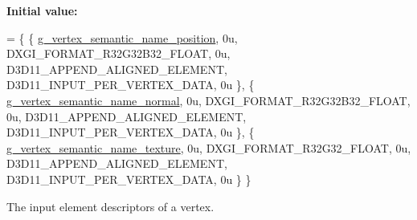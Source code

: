 {\bfseries Initial value\+:}
\begin{DoxyCode}
= \{
        \{ \hyperlink{namespacemage_1_1rendering_ae0a999915bd61d5a9d8addc04fe0646a}{g\_vertex\_semantic\_name\_position}, 0u, DXGI\_FORMAT\_R32G32B32\_FLOAT, 
         0u, D3D11\_APPEND\_ALIGNED\_ELEMENT, D3D11\_INPUT\_PER\_VERTEX\_DATA, 0u \},
        \{ \hyperlink{namespacemage_1_1rendering_aef3f964c7435c0b2009c7c5390ee3234}{g\_vertex\_semantic\_name\_normal},   0u, DXGI\_FORMAT\_R32G32B32\_FLOAT,   
       0u, D3D11\_APPEND\_ALIGNED\_ELEMENT, D3D11\_INPUT\_PER\_VERTEX\_DATA, 0u \},
        \{ \hyperlink{namespacemage_1_1rendering_a6db7535ff83c660f8b7ce8eed50178c6}{g\_vertex\_semantic\_name\_texture},  0u, DXGI\_FORMAT\_R32G32\_FLOAT,     
        0u, D3D11\_APPEND\_ALIGNED\_ELEMENT, D3D11\_INPUT\_PER\_VERTEX\_DATA, 0u \}
    \}
\end{DoxyCode}
The input element descriptors of a vertex. 